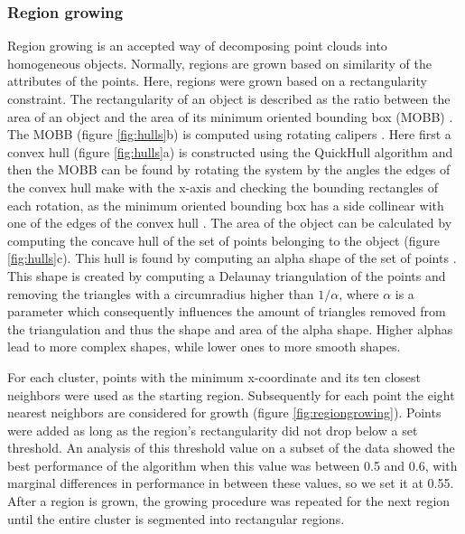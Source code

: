 \subsubsection{Region growing}
Region growing is an accepted way of decomposing point clouds \citep{rabbani2006segmentation, vosselman2013point} into homogeneous objects. Normally, regions are grown based on similarity of the attributes of the points. Here, regions were grown based on a rectangularity constraint. The rectangularity of an object is described as the ratio between the area of an object and the area of its minimum oriented bounding box (MOBB) \citep{rosin1999measuring}. The MOBB (figure \ref{fig:hulls}b) is computed using rotating calipers \citep{toussaint1983solving}. Here first a convex hull (figure \ref{fig:hulls}a) is constructed using the QuickHull algorithm \citep{preparata1985computational} and then the MOBB can be found by rotating the system by the angles the edges of the convex hull make with the x-axis and checking the bounding rectangles of each rotation, as the minimum oriented bounding box has a side collinear with one of the edges of the convex hull \citep{freeman1975determining}. The area of the object can be calculated by computing the concave hull of the set of points belonging to the object (figure \ref{fig:hulls}c). This hull is found by computing an alpha shape of the set of points \citep{edelsbrunner1983shape}. This shape is created by computing a Delaunay triangulation of the points \citep{delaunay1934sphere} and removing the triangles with a circumradius higher than \(1/\alpha\), where \(\alpha\) is a parameter which consequently influences the amount of triangles removed from the triangulation and thus the shape and area of the alpha shape. Higher alphas lead to more complex shapes, while lower ones to more smooth shapes.


For each cluster, points with the minimum x-coordinate and its ten closest neighbors were used as the starting region. Subsequently for each point the eight nearest neighbors are considered for growth (figure \ref{fig:regiongrowing}). Points were added as long as the region's rectangularity did not drop below a set threshold. An analysis of this threshold value on a subset of the data showed the best performance of the algorithm when this value was between 0.5 and 0.6, with marginal differences in performance in between these values, so we set it at 0.55. After a region is grown, the growing procedure was repeated for the next region until the entire cluster is segmented into rectangular regions.

